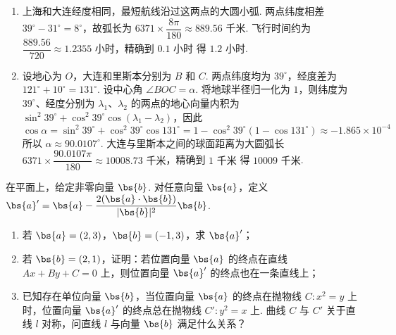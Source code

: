 \begin{solution}
\begin{enumerate}
\item 上海和大连经度相同，最短航线沿过这两点的大圆小弧. 两点纬度相差 \(39^\circ-31^\circ=8^\circ\)，故弧长为 \(6371\times\dfrac{8\pi}{180}\approx889.56\text{ 千米}\). 飞行时间约为 \(\dfrac{889.56}{720}\approx1.2355\text{ 小时}\)，精确到 \(0.1\text{ 小时}\) 得 \(1.2\text{ 小时}\).

\item 设地心为 \(O\)，大连和里斯本分别为 \(B\) 和 \(C\). 两点纬度均为 \(39^\circ\)，经度差为 \(121^\circ+10^\circ=131^\circ\). 设中心角 \(\angle BOC=\alpha\). 将地球半径归一化为 \(1\)，则纬度为 \(39^\circ\)、经度分别为 \(\lambda_1\)、\(\lambda_2\) 的两点的地心向量内积为 \(\sin^2 39^\circ+\cos^2 39^\circ\cos(\lambda_1-\lambda_2)\)，因此
\[
\cos\alpha=\sin^2 39^\circ+\cos^2 39^\circ\cos131^\circ=1-\cos^2 39^\circ(1-\cos131^\circ)\approx-1.865\times10^{-4}
\]
所以 \(\alpha\approx90.0107^\circ\). 大连与里斯本之间的球面距离为大圆弧长 \(6371\times\dfrac{90.0107\pi}{180}\approx10008.73\text{ 千米}\)，精确到 \(1\text{ 千米}\) 得 \(10009\text{ 千米}\).
\end{enumerate}
\end{solution}

\begin{problem}
在平面上，给定非零向量 \(\bs{b}\). 对任意向量 \(\bs{a}\)，定义 \(\bs{a}'=\bs{a}-\dfrac{2(\bs{a}\cdot\bs{b})}{|\bs{b}|^2}\bs{b}\).

\begin{enumerate}
\item 若 \(\bs{a}=(2,3)\)，\(\bs{b}=(-1,3)\)，求 \(\bs{a}'\)；
\item 若 \(\bs{b}=(2,1)\)，证明：若位置向量 \(\bs{a}\) 的终点在直线 \(Ax+By+C=0\) 上，则位置向量 \(\bs{a}'\) 的终点也在一条直线上；
\item 已知存在单位向量 \(\bs{b}\)，当位置向量 \(\bs{a}\) 的终点在抛物线 \(C:x^2=y\) 上时，位置向量 \(\bs{a}'\) 的终点总在抛物线 \(C':y^2=x\) 上. 曲线 \(C\) 与 \(C'\) 关于直线 \(l\) 对称，问直线 \(l\) 与向量 \(\bs{b}\) 满足什么关系？
\end{enumerate}
\end{problem}

